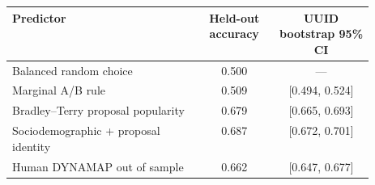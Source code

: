 \begin{tabular}{p{0.52\linewidth}cc}
\toprule
Predictor & Held-out accuracy & UUID bootstrap 95\% CI \\
\midrule
Balanced random choice & 0.500 & --- \\
Marginal A/B rule & 0.509 & [0.494, 0.524] \\
Bradley--Terry proposal popularity & 0.679 & [0.665, 0.693] \\
Sociodemographic + proposal identity & 0.687 & [0.672, 0.701] \\
Human DYNAMAP out of sample & 0.662 & [0.647, 0.677] \\
\bottomrule
\end{tabular}
